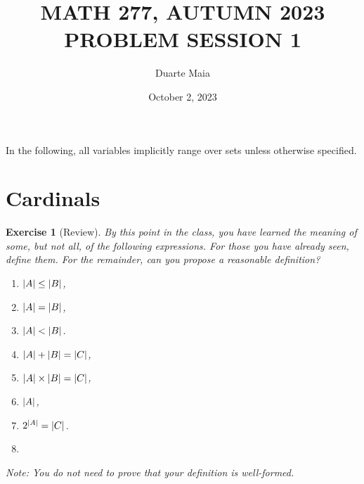 \documentclass{article}
\title{MATH 277, AUTUMN 2023\\PROBLEM SESSION 1}
\author{Duarte Maia}
\date{October 2, 2023}
\newtheorem{ex}{Exercise}
\theoremstyle{nonumberplain}
\DeclarePairedDelimiter{\abs}{\lvert}{\rvert}
\begin{document}
\maketitle

In the following, all variables implicitly range over sets unless otherwise specified.

\section{Cardinals}

\begin{ex}[Review]
By this point in the class, you have learned the meaning of some, but not all, of the following expressions. For those you have already seen, define them. For the remainder, can you propose a reasonable definition?
\begin{multicols}{2}
\begin{enumerate}
\item\label{itemi} $\abs{A} \leq \abs{B}$,
\item\label{itemii} $\abs{A} = \abs{B}$,
\item\label{itemiii} $\abs{A} < \abs{B}$.
\item $\abs{A} + \abs{B} = \abs{C}$,
\item $\abs{A} \times \abs{B} = \abs C$,
\item $\abs{A}$,
\item $2^{\abs{A}} = \abs{C}$.
\item[\vspace{\fill}]
\end{enumerate}
\end{multicols}

Note: You do not need to prove that your definition is well-formed.
\end{ex}
\end{document}
